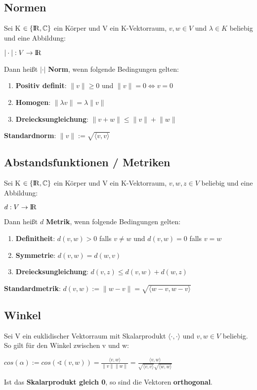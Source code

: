 \documentclass[10pt,a4paper]{article}
\def\realnumbers{{\rm I\!R}}
\def\complexnumbers{{\mathbb{C}}}
\newcommand{\norm}[1]{\lVert#1\rVert}
\begin{document}
	\subsection{Normen}
	Sei K $\in \{\realnumbers,\complexnumbers\}$ ein Körper und V ein K-Vektorraum, $v, w \in V$ und $\lambda \in K$ beliebig und eine Abbildung:
	\begin{center}
		$|\cdot|: V \rightarrow \realnumbers$
	\end{center}
	Dann heißt $|\cdot|$ \textbf{Norm}, wenn folgende Bedingungen gelten:
	\begin{enumerate}
		\item \textbf{Positiv definit}: $\norm{v} \geq 0$ und $\norm{v} = 0 \Leftrightarrow v = 0$
		\item \textbf{Homogen}: $\norm{\lambda v} = \lambda \norm{v}$
		\item \textbf{Dreiecksungleichung}: $\norm{v + w} \leq \norm{v} + \norm{w}$
	\end{enumerate}
	\textbf{Standardnorm}: $\norm{v} := \sqrt{\langle v, v\rangle}$
	
	\subsection{Abstandsfunktionen / Metriken}
	Sei K $\in \{\realnumbers,\complexnumbers\}$ ein Körper und V ein K-Vektorraum, $v, w, z \in V$ beliebig und eine Abbildung:
	\begin{center}
		$d: V \rightarrow \realnumbers$
	\end{center}
	Dann heißt $d$ \textbf{Metrik}, wenn folgende Bedingungen gelten:
	\begin{enumerate}
		\item \textbf{Definitheit}: $d(v, w) > 0$ falls $v \neq w$ und $d(v, w) = 0$ falls $v = w$
		\item \textbf{Symmetrie}: $d(v, w) = d(w, v)$
		\item \textbf{Dreiecksungleichung}: $d(v, z) \leq d(v, w) + d(w, z)$
	\end{enumerate}
	\textbf{Standardmetrik}: $d(v, w) := \norm{w - v} = \sqrt{\langle w - v, w - v\rangle}$
		
	\subsection{Winkel}
	Sei V ein euklidischer Vektorraum mit Skalarprodukt $\langle \cdot, \cdot\rangle$ und $v, w\in V$ beliebig. So gilt für den Winkel zwischen v und w:
	\begin{center}
		$cos(\alpha) := cos(\sphericalangle(v, w)) = \frac{\langle v, w\rangle}{\norm{v}\norm{w}} = \frac{\langle v, w\rangle}{\sqrt{\langle v, v \rangle}\sqrt{\langle w, w\rangle}}$
	\end{center}
	Ist das \textbf{Skalarprodukt gleich 0}, so sind die Vektoren \textbf{orthogonal}.
	\newpage
\end{document}
